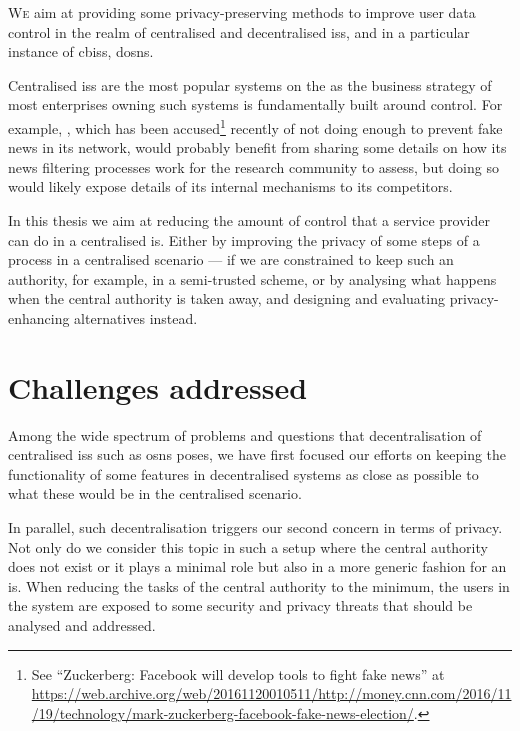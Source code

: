 

\lettrine{\textcolor[gray]{.25}{W}}{e} aim at providing some privacy-preserving 
methods to improve user data control in the realm of centralised and decentralised 
\acp{is}, and in a particular instance of \acp{cbis}, \acp{dosn}.

Centralised \acp{is} are the most popular systems on the \Internet as the business 
strategy of most enterprises owning such systems is fundamentally built around control. 
For example, \Facebook, which has been accused\footnote{See ``Zuckerberg: Facebook will develop tools to fight fake news'' at \url{https://web.archive.org/web/20161120010511/http://money.cnn.com/2016/11/19/technology/mark-zuckerberg-facebook-fake-news-election/}.} 
recently of not doing enough to prevent fake news in its network, would probably 
benefit from sharing some details on how its news filtering processes work for the 
research community to assess, but doing so would likely expose details of its internal 
mechanisms to its competitors.

In this thesis we aim at reducing the amount of control that a service provider 
can do in a centralised \ac{is}. Either by improving the privacy of some steps of 
a process in a centralised scenario --- if we are constrained to keep such an authority, 
for example, in a semi-trusted scheme, or by analysing what happens when the central 
authority is taken away, and designing and evaluating privacy-enhancing alternatives 
instead.

\section{Challenges addressed}
    \label{section:thesis:challenges-addressed}
Among the wide spectrum of problems and questions that decentralisation of centralised 
\acp{is} such as \acp{osn} poses, we have first focused our efforts on keeping the 
functionality of some features in decentralised systems as close as possible to 
what these would be in the centralised scenario.

In parallel, such decentralisation triggers our second concern in terms of privacy.
Not only do we consider this topic in such a setup where the central authority does 
not exist or it plays a minimal role but also in a more generic fashion for an \ac{is}. 
When reducing the tasks of the central authority to the minimum, the users in the 
system are exposed to some security and privacy threats that should be analysed 
and addressed.

